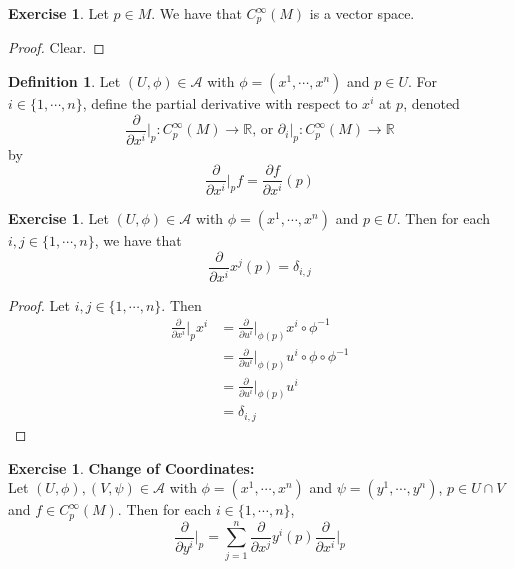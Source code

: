\documentclass{book}
\theoremstyle{definition}
\newtheorem{defn}[definition]{Definition}
\newtheorem{ex}[definition]{Exercise}
\newcommand{\del}{\delta}
\newcommand{\R}{\mathbb{R}}
\newcommand{\MA}{\mathcal{A}}
\newcommand{\MN}{\mathcal{N}}
\DeclareMathOperator*{\0}{\mbf{0}}
\DeclareMathOperator*{\1}{\mbf{1}}
\newcommand{\p}{\partial}
\begin{document}
	
	\begin{ex}
		Let $p \in M$. We have that $C_p^{\infty}(M)$ is a vector space. 
	\end{ex}
	
	\begin{proof}
		Clear.
	\end{proof}

	\begin{defn}
		Let $(U, \phi) \in \MA$ with $\phi = (x^1, \cdots, x^n)$ and $p \in U$. For $i \in \{1, \cdots, n\}$, define the partial derivative with respect to $x^i$ at $p$, denoted $$\frac{\p}{\p x^i} \bigg|_p: C_p^{\infty}(M) \rightarrow \R  \text{, or } \p_i|_p: C_p^{\infty}(M) \rightarrow \R $$ by $$ \frac{\p}{\p x^i} \bigg |_p  f =  \frac{\p f}{\p x^i}(p) $$
	\end{defn}

	\begin{ex}
		Let $(U, \phi) \in \MA$ with $\phi = (x^1, \cdots, x^n)$ and $p \in U$. Then for each $i,j \in \{1, \cdots, n\}$, we have that $${\frac{\p}{\p x^i}{x^j}}(p) = \del_{i,j}$$
	\end{ex}

	\begin{proof}
		Let $i,j \in \{1, \cdots, n\}$. Then 
		\begin{align*}
			\frac{\p}{\p x^i} \bigg|_p x^i 
			&=  \frac{\p}{\p u^i} \bigg|_{\phi(p)} x^i \circ \phi^{-1} \\
			&= \frac{\p}{\p u^i} \bigg|_{\phi(p)} u^i \circ \phi \circ \phi^{-1} \\
			&= \frac{\p}{\p u^i} \bigg|_{\phi(p)} u^i  \\
			&= \del_{i,j}
		\end{align*}
	\end{proof}

	\begin{ex} \textbf{Change of Coordinates:}\\
		Let $(U, \phi), (V, \psi) \in \MA$ with $\phi = (x^1, \cdots, x^n)$ and $\psi = (y^1, \cdots, y^n)$, $p \in U \cap V$ and $f \in C_p^{\infty}(M)$. Then for each $i \in \{1, \cdots, n\}$, 
		 $$\frac{\p}{\p y^i} \bigg|_p = \sum_{j =1}^n {\frac{\p}{\p x^j}{y^i}}(p) \frac{\p}{\p x^i} \bigg|_p    $$
	\end{ex}
\end{document}
